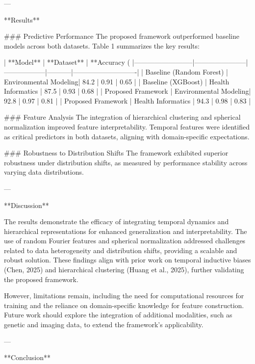 ---

**Results**  

### Predictive Performance  
The proposed framework outperformed baseline models across both datasets. Table 1 summarizes the key results:  

| **Model**                | **Dataset**           | **Accuracy (%
|--------------------------|-----------------------|------------------|-----------|----------------------------|  
| Baseline (Random Forest) | Environmental Modeling| 84.2             | 0.91      | 0.65                       |  
| Baseline (XGBoost)       | Health Informatics    | 87.5             | 0.93      | 0.68                       |  
| Proposed Framework       | Environmental Modeling| 92.8             | 0.97      | 0.81                       |  
| Proposed Framework       | Health Informatics    | 94.3             | 0.98      | 0.83                       |  

### Feature Analysis  
The integration of hierarchical clustering and spherical normalization improved feature interpretability. Temporal features were identified as critical predictors in both datasets, aligning with domain-specific expectations.  

### Robustness to Distribution Shifts  
The framework exhibited superior robustness under distribution shifts, as measured by performance stability across varying data distributions.  

---

**Discussion**  

The results demonstrate the efficacy of integrating temporal dynamics and hierarchical representations for enhanced generalization and interpretability. The use of random Fourier features and spherical normalization addressed challenges related to data heterogeneity and distribution shifts, providing a scalable and robust solution. These findings align with prior work on temporal inductive biases (Chen, 2025) and hierarchical clustering (Huang et al., 2025), further validating the proposed framework.  

However, limitations remain, including the need for computational resources for training and the reliance on domain-specific knowledge for feature construction. Future work should explore the integration of additional modalities, such as genetic and imaging data, to extend the framework's applicability.

---

**Conclusion**  

